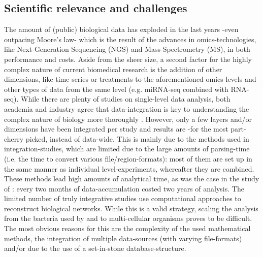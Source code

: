\documentclass[twoside,fontsize=10pt]{article}
\begin{document}
\subsection*{Scientific relevance and challenges} %
The amount of (public) biological data has exploded in the last years -even outpacing Moore's law- which is the result of the advances in omics-technologies, like Next-Generation Sequencing (NGS) and Mass-Spectrometry (MS), in both performance and costs. Aside from the sheer size, a second factor for the highly complex nature of current biomedical research is the addition of other dimensions, like time-series or treatments to the aforementioned omics-levels and other types of data from the same level (e.g. miRNA-seq combined with RNA-seq). While there are plenty of studies on single-level data analysis, both academia and industry agree that data-integration is key to understanding the complex nature of biology more thoroughly \citep{Gomez-Cabrero2014, Huttenhower2010, Searls2005, Hamid2009}. However, only a few layers and/or dimensions have been integrated per study and results are -for the most part- cherry picked, instead of data-wide. This is mainly due to the methods used in integration-studies, which are limited due to the large amounts of parsing-time (i.e. the time to convert various file/region-formats): most of them are set up in the same manner as individual level-experiments, whereafter they are combined. These methods lead high amounts of analytical time, as was the case in the study of \citet{Munoz2011}: every two months of data-accumulation costed two years of analysis. The limited number of truly integrative studies use computational approaches to reconstruct biological networks. While this is a valid strategy, scaling the analysis from the bacteria used by \citet{Karr2012} and \citet{Lerman2012} to multi-cellular organisms proves to be difficult. The most obvious reasons for this are the complexity of the used mathematical methods, the integration of multiple data-sources (with varying file-formats) and/or due to the use of a set-in-stone database-structure. 
\medskip
\end{document}
